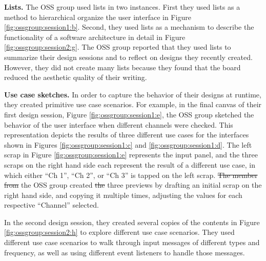 \documentclass[12pt,fleqn]{ucithesis}
\providecommand{\DIFaddtex}[1]{{\protect\color{blue}\uwave{#1}}} %
\providecommand{\DIFdeltex}[1]{{\protect\color{red}\sout{#1}}}                      %
\providecommand{\DIFaddbegin}{} %
\providecommand{\DIFaddend}{} %
\providecommand{\DIFdelbegin}{} %
\providecommand{\DIFdelend}{} %
\providecommand{\DIFadd}[1]{\texorpdfstring{\DIFaddtex{#1}}{#1}} %
\providecommand{\DIFdel}[1]{\texorpdfstring{\DIFdeltex{#1}}{}} %
\begin{document}

\textbf{Lists. } The OSS group used lists in two instances. First they used lists as a method to hierarchical organize the user interface in Figure \ref{fig:ossgroup:session1:b}. Second, they used lists as a mechanism to describe the functionality of a software architecture in detail in Figure \ref{fig:ossgroup:session2:g}. The OSS group reported that they used lists to summarize their design sessions and to reflect on designs they recently created. However, they did not create many lists because they found that the board reduced the aesthetic quality of their writing.

\textbf{Use case sketches. } In order to capture the behavior of their designs at runtime, they created primitive use case scenarios. For example, in the final canvas of their first design session, Figure \ref{fig:ossgroup:session1:e}, the OSS group sketched the behavior of the user interface when different channels were checked. This representation depicts the results of three different use cases for the interfaces shown in Figures \ref{fig:ossgroup:session1:c} and \ref{fig:ossgroup:session1:d}. The left scrap in Figure \ref{fig:ossgroup:session1:e} represents the input panel, and the three scraps on the right hand side each represent the result of a different use case, in which either ``Ch 1'', ``Ch 2'', or ``Ch 3'' is tapped on the left scrap. \DIFdelbegin \DIFdel{The member from }\DIFdelend \DIFaddbegin \DIFadd{A member of }\DIFaddend the OSS group created \DIFdelbegin \DIFdel{the }\DIFdelend \DIFaddbegin \DIFadd{these }\DIFaddend three previews by drafting an initial scrap on the right hand side, and copying it multiple times, adjusting the values for each respective ``Channel'' selected. 

In the second design session, they created several copies of the contents in Figure \ref{fig:ossgroup:session2:h} to explore different use case scenarios. They used different use case scenarios to walk through input messages of different types and frequency, as well as using different event listeners to handle those messages.
\end{document}
